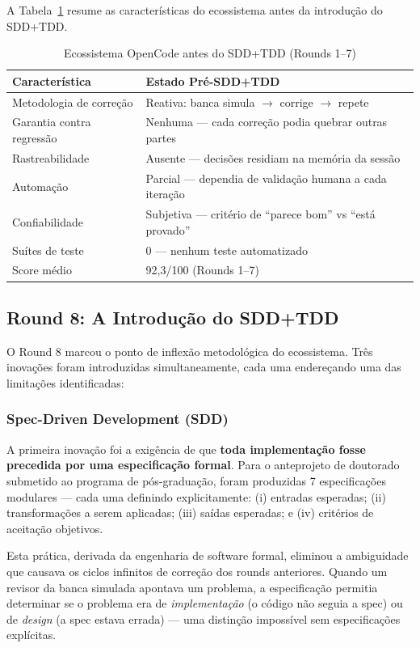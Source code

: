A Tabela~\ref{tab:pre_sdd} resume as características do ecossistema antes da
introdução do SDD+TDD.

\begin{table}[H]\centering
\caption{Ecossistema OpenCode antes do SDD+TDD (Rounds 1--7)}
\label{tab:pre_sdd}
\begin{tabular}{p{}p{}}
\toprule
\textbf{Característica} & \textbf{Estado Pré-SDD+TDD} \\
\midrule
Metodologia de correção & Reativa: banca simula $\to$ corrige $\to$ repete \\
Garantia contra regressão & Nenhuma — cada correção podia quebrar outras partes \\
Rastreabilidade & Ausente — decisões residiam na memória da sessão \\
Automação & Parcial — dependia de validação humana a cada iteração \\
Confiabilidade & Subjetiva — critério de ``parece bom'' vs ``está provado'' \\
Suítes de teste & 0 — nenhum teste automatizado \\
Score médio & 92,3/100 (Rounds 1--7) \\
\bottomrule
\end{tabular}
\end{table}

\subsection{Round 8: A Introdução do SDD+TDD}

O Round 8 marcou o ponto de inflexão metodológica do ecossistema. Três
inovações foram introduzidas simultaneamente, cada uma endereçando uma das
limitações identificadas:

\subsubsection{Spec-Driven Development (SDD)}

A primeira inovação foi a exigência de que \textbf{toda implementação fosse
precedida por uma especificação formal}. Para o anteprojeto de doutorado
submetido ao programa de pós-graduação, foram produzidas 7 especificações
modulares — cada uma definindo explicitamente: (i) entradas esperadas;
(ii) transformações a serem aplicadas; (iii) saídas esperadas; e (iv)
critérios de aceitação objetivos.

Esta prática, derivada da engenharia de software formal, eliminou a
ambiguidade que causava os ciclos infinitos de correção dos rounds anteriores.
Quando um revisor da banca simulada apontava um problema, a especificação
permitia determinar se o problema era de \textit{implementação} (o código
não seguia a spec) ou de \textit{design} (a spec estava errada) — uma
distinção impossível sem especificações explícitas.

